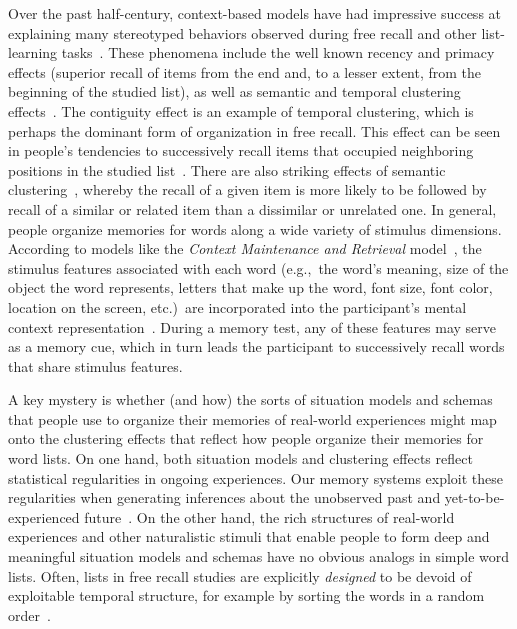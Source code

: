 \documentclass[11pt]{article}
\begin{document}
Over the past half-century, context-based models have had impressive success at
explaining many stereotyped behaviors observed during free recall and other
list-learning tasks~\citep{Este55a, RaaiShif80, GlenEtal83, HowaKaha02a,
SiroEtal05, KimbEtal07, PolyKaha08, SedeEtal08, PolyEtal09, ShanHowa12}. These
phenomena include the well known recency and primacy effects (superior recall
of items from the end and, to a lesser extent, from the beginning of the studied
list), as well as semantic and temporal clustering effects~\citep{KahaEtal08b,
HowaKaha02b}. The contiguity effect is an example of temporal clustering, which
is perhaps the dominant form of organization in free recall. This effect can be
seen in people's tendencies to successively recall items that occupied
neighboring positions in the studied list~\citep{Kaha96}. There are also
striking effects of semantic clustering~\citep{RomnEtal93, Bous53, BousEtal54,
JenkRuss52, MannKaha12}, whereby the recall of a given item is more likely to
be followed by recall of a similar or related item than a dissimilar or
unrelated one. In general, people organize memories for words along a wide
variety of stimulus dimensions. According to models like the
\textit{Context Maintenance and Retrieval} model~\citep{PolyEtal09}, the
stimulus features associated with each word (e.g.,\ the word's meaning, size of
the object the word represents, letters that make up the word, font size,
font color, location on the screen, etc.)~are incorporated into the
participant's mental context representation~\citep{SmitVela01, MannEtal11,
MannEtal12, MannEtal15, Mann20}. During a memory test, any of these features
may serve as a memory cue, which in turn leads the participant to successively recall
words that share stimulus features.


A key mystery is whether (and how) the sorts of situation models and schemas
that people use to organize their memories of real-world experiences might map
onto the clustering effects that reflect how people organize their memories for
word lists. On one hand, both situation models and clustering effects reflect
statistical regularities in ongoing experiences. Our memory systems exploit
these regularities when generating inferences about the unobserved past and
yet-to-be-experienced future~\citep{XuEtal23, SchaTurk15, RangRitc12,
BoweEtal79, MomeEtal17}. On the other hand, the rich structures of real-world
experiences and other naturalistic stimuli that enable people to form deep and
meaningful situation models and schemas have no obvious analogs in simple word
lists. Often, lists in free recall studies are explicitly \textit{designed} to
be devoid of exploitable temporal structure, for example by sorting the words
in a random order~\citep{Kaha12}.
\end{document}
